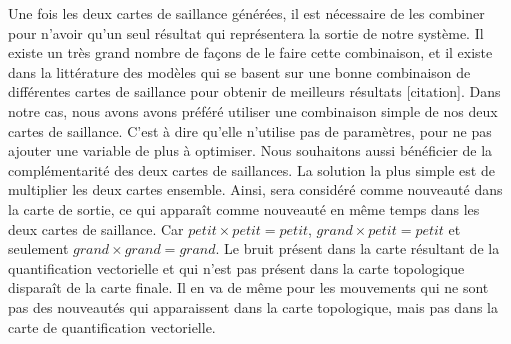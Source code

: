 	Une fois les deux cartes de saillance générées, il est nécessaire de les combiner pour n'avoir qu'un seul résultat qui représentera la sortie de notre système. Il existe un très grand nombre de façons de le faire cette combinaison, et il existe dans la littérature des modèles qui se basent sur une bonne combinaison de différentes cartes de saillance pour obtenir de meilleurs résultats [citation]. Dans notre cas, nous avons avons préféré utiliser une combinaison simple de nos deux cartes de saillance. C'est à dire qu'elle n'utilise pas de paramètres, pour ne pas ajouter une variable de plus à optimiser. Nous souhaitons aussi bénéficier de la complémentarité des deux cartes de saillances. La solution la plus simple est de multiplier les deux cartes ensemble. Ainsi, sera considéré comme nouveauté dans la carte de sortie, ce qui apparaît comme nouveauté en même temps dans les deux cartes de saillance. Car $\textit{petit} \times \textit{petit} = \textit{petit}$, $\textit{grand} \times \textit{petit} = \textit{petit}$ et seulement $\textit{grand} \times \textit{grand} = \textit{grand}$. Le bruit présent dans la carte résultant de la quantification vectorielle et qui n'est pas présent dans la carte topologique disparaît de la carte finale. Il en va de même pour les mouvements qui ne sont pas des nouveautés qui apparaissent dans la carte topologique, mais pas dans la carte de quantification vectorielle.

